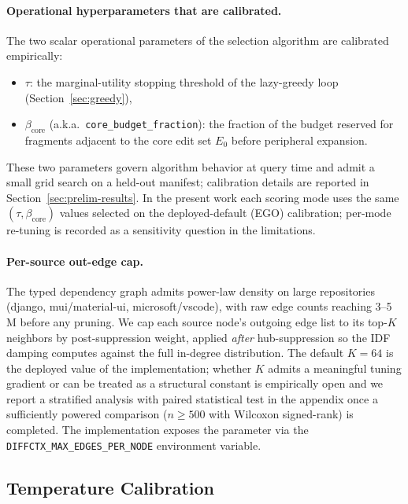 \documentclass[11pt, a4paper]{article}
\begin{document}
\paragraph{Operational hyperparameters that are calibrated.} The two scalar operational parameters of the selection algorithm are calibrated empirically:
\begin{itemize}
    \item $\tau$: the marginal-utility stopping threshold of the lazy-greedy loop (Section~\ref{sec:greedy}),
    \item $\beta_{\mathrm{core}}$ (a.k.a.\ \texttt{core\_budget\_fraction}): the fraction of the budget reserved for fragments adjacent to the core edit set $E_0$ before peripheral expansion.
\end{itemize}
These two parameters govern algorithm behavior at query time and admit a small grid search on a held-out manifest; calibration details are reported in Section~\ref{sec:prelim-results}. In the present work each scoring mode uses the same $(\tau, \beta_{\mathrm{core}})$ values selected on the deployed-default (EGO) calibration; per-mode re-tuning is recorded as a sensitivity question in the limitations.

\paragraph{Per-source out-edge cap.} The typed dependency graph admits power-law density on large repositories (django, mui/material-ui, microsoft/vscode), with raw edge counts reaching 3--5\,M before any pruning. We cap each source node's outgoing edge list to its top-$K$ neighbors by post-suppression weight, applied \emph{after} hub-suppression so the IDF damping computes against the full in-degree distribution. The default $K{=}64$ is the deployed value of the implementation; whether $K$ admits a meaningful tuning gradient or can be treated as a structural constant is empirically open and we report a stratified analysis with paired statistical test in the appendix once a sufficiently powered comparison ($n{\geq}500$ with Wilcoxon signed-rank) is completed. The implementation exposes the parameter via the \texttt{DIFFCTX\_MAX\_EDGES\_PER\_NODE} environment variable.

\subsection{Temperature Calibration}
\label{sec:beta-calibration}
\end{document}
